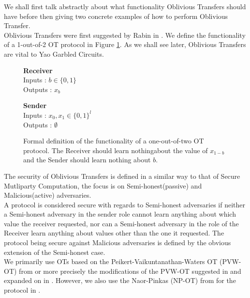 \documentclass[ %
                    author={Nicholas Tutte},
                supervisor={Prof. Nigel Smart},
                    degree={MEng},
                     title={Secure Two Party Computation},
                  subtitle={A practical comparison of recent protocols},
                      type={Research - GG1K},
                      year={2015} ]{dissertation}
\begin{document}
			We shall first talk abstractly about what functionality Oblivious Transfers should have before then giving two concrete examples of how to perform Oblivious Transfer.\\

			Oblivious Transfers were first suggested by Rabin in \cite{Rabin81}. We define the functionality of a 1-out-of-2 OT protocol in Figure \ref{fig:OTformalDef}. As we shall see later, Oblivious Transfers are vital to Yao Garbled Circuits. 

			\begin{figure}[!htb]
				\centering
				\begin{minipage}{0.45\textwidth}
					\centering
					\textbf{Receiver}\\
					Inputs : $b \in \{0, 1\}$\\
					Outputs : $x_b$\\
				\end{minipage}
				\begin{minipage}{0.45\textwidth}
					\centering
					\textbf{Sender}\\
					Inputs : $x_0, x_1 \in \{0, 1\}^l$\\
					Outputs : $\emptyset$\\
				\end{minipage}

				\caption{ Formal definition of the functionality of a one-out-of-two OT protocol. The Receiver should learn nothingabout the value of $x_{1-b}$ and the Sender should learn nothing about $b$.\label{fig:OTformalDef}}
				
			\end{figure}

			The security of Oblivious Transfers is defined in a similar way to that of Secure Mutliparty Computation, the focus is on Semi-honest(passive) and Malicious(active) adversaries.\\

			A protocol is considered secure with regards to Semi-honest adversaries if neither a Semi-honest adversary in the sender role cannot learn anything about which value the receiver requested, nor can a Semi-honest adversary in the role of the Receiver learn anything about values other than the one it requested. The protocol being secure against Malicious adversaries is defined by the obvious extension of the Semi-honest case.\\

			We primarily use OTs based on the Peikert-Vaikuntanathan-Waters OT (PVW-OT) from \cite{PVW_OT_2008} or more precisely the modifications of the PVW-OT suggested in \cite{LindellAndPinkas2011} and expanded on in \cite{Lindell_CnC_2013}. However, we also use the Naor-Pinkas (NP-OT) from \cite{NaorPinkasOT2001} for the protocol in \cite{Katz_Symm_CnC_2013}.
\end{document}
